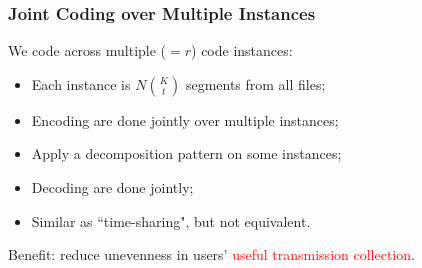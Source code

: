 \documentclass{beamer}
\begin{document}
\begin{frame}
\frametitle{Joint Coding over Multiple Instances}
We code across multiple ($=r$) code instances:
\begin{itemize}
\item Each instance is $N\binom{K}{t}$ segments from all files;
\item Encoding are done jointly over multiple instances;
\pause
\item Apply a decomposition pattern on some instances;
\item Decoding are done jointly;
\item Similar as ``time-sharing", but not equivalent.
\end{itemize}

\vspace{2cm}
\pause
Benefit: reduce unevenness in users\rq{} \textcolor{red}{useful transmission collection}. 
\end{frame}

\end{document}
